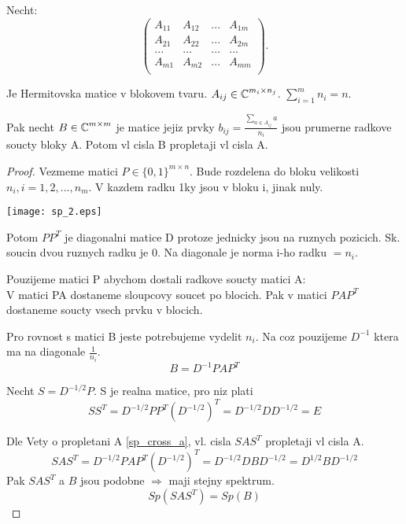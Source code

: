 \begin{theorem}[Propletani B]\label{sp_cross_b}
	Necht:
	\[
	\begin{pmatrix}
		A_{11} & A_{12} & ... & A_{1m}\\
		A_{21} & A_{22} & ... & A_{2m}\\
		... & ... & ... & ... \\
		A_{m1} & A_{m2} & ... & A_{mm}\\
	\end{pmatrix}.
\]

	Je Hermitovska matice v blokovem tvaru. $A_{ij} \in \operatorname{\mathbb{C}}^{m_i \times n_j}$.
	$\sum_{i=1}^m n_i = n$.

	Pak necht $B \in \operatorname{\mathbb{C}}^{m \times m}$ je matice jejiz prvky $b_{ij} = \frac{\sum_{a \in A_{ij}} a}{n_i} $ jsou prumerne radkove soucty bloky A.
	Potom vl cisla B propletaji vl cisla A.
\end{theorem}
\begin{proof}
	Vezmeme matici $P \in \{0, 1\}^{m \times n}$. Bude rozdelena do bloku velikosti $n_i, i = 1,2,...,n_m$.
	V kazdem radku 1ky jsou v bloku i, jinak nuly.

	\texttt{[image: sp\_2.eps]}

	Potom $PP^T$ je diagonalni matice D protoze jednicky jsou na ruznych pozicich. Sk. soucin dvou ruznych radku je 0.
	Na diagonale je norma i-ho radku $= n_i$.

	Pouzijeme matici P abychom dostali radkove soucty matici A:\\
	V matici PA dostaneme sloupcovy soucet po blocich. Pak v matici $PAP^T$ dostaneme soucty vsech prvku v blocich.

	Pro rovnost s matici B jeste potrebujeme vydelit $n_i$. Na coz pouzijeme $D^{-1}$ ktera ma na diagonale $\frac{1}{n_i}$.
	\[ B = D^{-1}PAP^T \]

	Necht $S = D^{-1/2}P$. S je realna matice, pro niz plati
	\[ SS^T = D^{-1/2}PP^T(D^{-1/2})^T = D^{-1/2}DD^{-1/2} = E \]

	Dle Vety o propletani A \cref{sp_cross_a}, vl. cisla $SAS^T$ propletaji vl cisla A.
	\[ SAS^T = D^{-1/2}PAP^T(D^{-1/2})^T = D^{-1/2}DBD^{-1/2} = D^{1/2}BD^{-1/2} \]
	Pak $SAS^T$ a $B$ jsou podobne $\Rightarrow$ maji stejny spektrum.
	\[ Sp(SAS^T) = Sp(B) \]
\end{proof}

